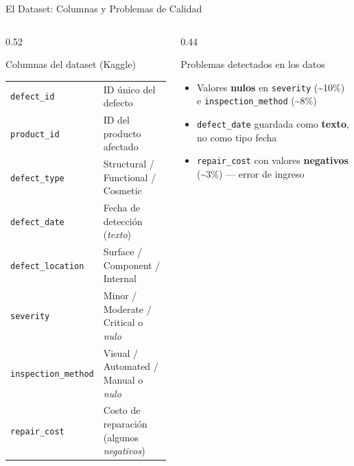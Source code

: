 \documentclass[aspectratio=169]{beamer}
\newcommand{\tech}[1]{\texttt{\textcolor{mainColor}{#1}}}
\begin{document}
\begin{frame}{El Dataset: Columnas y Problemas de Calidad}
  \begin{columns}[T]
    \begin{column}{0.52\textwidth}
      \begin{conceptbox}{\faFileCsv\enspace Columnas del dataset (Kaggle)}
        \tiny
        \begin{tabular}{ll}
          \tech{defect\_id} & ID único del defecto\\[3pt]
          \tech{product\_id} & ID del producto afectado\\[3pt]
          \tech{defect\_type} & Structural / Functional / Cosmetic\\[3pt]
          \tech{defect\_date} & Fecha de detección (\textit{texto})\\[3pt]
          \tech{defect\_location} & Surface / Component / Internal\\[3pt]
          \tech{severity} & Minor / Moderate / Critical o \textit{nulo}\\[3pt]
          \tech{inspection\_method} & Visual / Automated / Manual o \textit{nulo}\\[3pt]
          \tech{repair\_cost} & Costo de reparación (algunos \textit{negativos})
        \end{tabular}
      \end{conceptbox}
    \end{column}
    \begin{column}{0.44\textwidth}
      \begin{alertblock}{\faExclamationTriangle\enspace Problemas detectados en los datos}
        \small
        \begin{itemize}\setlength\itemsep{6pt}
          \item Valores \textbf{nulos} en \texttt{severity} (\textasciitilde10\%) e \texttt{inspection\_method} (\textasciitilde8\%)
          \item \texttt{defect\_date} guardada como \textbf{texto}, no como tipo fecha
          \item \texttt{repair\_cost} con valores \textbf{negativos} (\textasciitilde3\%) --- error de ingreso
        \end{itemize}
      \end{alertblock}
    \end{column}
  \end{columns}
\end{frame}
\end{document}
